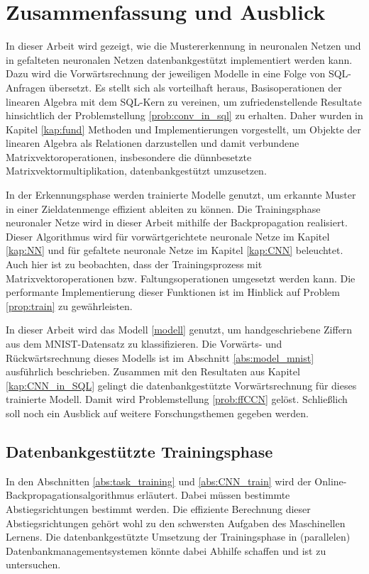 \chapter{Zusammenfassung und Ausblick}
\label{kap:sum}

In dieser Arbeit wird gezeigt, wie die Mustererkennung in neuronalen Netzen und in gefalteten neuronalen Netzen datenbankgestützt implementiert werden kann. Dazu wird die Vorwärtsrechnung der jeweiligen Modelle in eine Folge von SQL-Anfragen übersetzt. Es stellt sich als vorteilhaft heraus, Basisoperationen der linearen Algebra mit dem SQL-Kern zu vereinen, um zufriedenstellende Resultate hinsichtlich der Problemstellung \ref{prob:conv_in_sql} zu erhalten. Daher wurden in Kapitel \ref{kap:fund} Methoden und Implementierungen vorgestellt, um Objekte der linearen Algebra als Relationen darzustellen und damit verbundene Matrixvektoroperationen, insbesondere die dünnbesetzte Matrixvektormultiplikation, datenbankgestützt umzusetzen.

In der Erkennungsphase werden trainierte Modelle genutzt, um erkannte Muster in einer Zieldatenmenge effizient ableiten zu können. Die Trainingsphase neuronaler Netze wird in dieser Arbeit mithilfe der Backpropagation realisiert. Dieser Algorithmus wird für vorwärtgerichtete neuronale Netze im Kapitel \ref{kap:NN} und für gefaltete neuronale Netze im Kapitel \ref{kap:CNN} beleuchtet. Auch hier ist zu beobachten, dass der Trainingsprozess mit Matrixvektoroperationen bzw. Faltungsoperationen umgesetzt werden kann. Die performante Implementierung dieser Funktionen ist im Hinblick auf Problem \ref{prop:train} zu gewährleisten. 

In dieser Arbeit wird das Modell \ref{modell} genutzt, um handgeschriebene Ziffern aus dem MNIST-Datensatz zu klassifizieren. Die Vorwärts- und Rückwärtsrechnung dieses Modells ist im Abschnitt \ref{abs:model_mnist} ausführlich beschrieben. Zusammen mit den Resultaten aus Kapitel \ref{kap:CNN_in_SQL} gelingt die datenbankgestützte Vorwärtsrechnung für dieses trainierte Modell. Damit wird Problemstellung \ref{prob:ffCCN} gelöst. Schließlich soll noch ein Ausblick auf weitere Forschungsthemen gegeben werden.

\section*{Datenbankgestützte Trainingsphase}
In den Abschnitten \ref{abs:task_training} und \ref{abs:CNN_train} wird der Online-Backpropagationsalgorithmus erläutert. Dabei müssen bestimmte Abstiegsrichtungen bestimmt werden. Die effiziente Berechnung dieser Abstiegsrichtungen gehört wohl zu den schwersten Aufgaben des Maschinellen Lernens. Die datenbankgestützte Umsetzung der Trainingsphase in (parallelen) Datenbankmanagementsystemen könnte dabei Abhilfe schaffen und ist zu untersuchen. 

